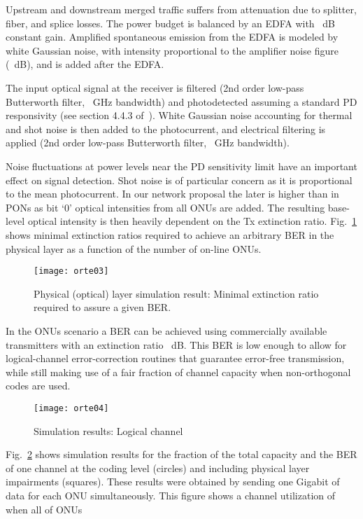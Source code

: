 \documentclass[10pt]{article}
\begin{document}
Upstream and downstream merged traffic suffers from attenuation due to
splitter, fiber, and
splice losses. The power budget is balanced by an EDFA with ~dB constant gain.
Amplified spontaneous emission from the EDFA is modeled by white Gaussian
noise, with intensity proportional to the amplifier noise figure (~dB), and is added
after the EDFA. 


The input optical signal at the receiver is filtered (2nd order low-pass Butterworth filter, ~GHz bandwidth) and photodetected assuming a standard PD responsivity (see section 4.4.3 of~\cite{Agrawal:xx}).
White Gaussian noise accounting for thermal and shot noise is then added
to the photocurrent, and 
electrical filtering is applied (2nd order low-pass Butterworth filter, ~GHz bandwidth).

Noise fluctuations at power levels near the PD sensitivity limit have an important effect on signal detection. 
Shot noise is of particular concern as it is proportional to the mean photocurrent.
In our network proposal the later is higher than in PONs as bit
`0' optical intensities from all ONUs are added.
The resulting base-level optical intensity is then heavily dependent on the Tx extinction ratio.
Fig.~\ref{sim:optical} shows minimal extinction ratios required to
achieve an arbitrary BER in the physical layer as a function of the
number of on-line ONUs.
\begin{figure}[!t]
    \centering
      \texttt{[image: orte03]}
      \caption{Physical (optical) layer simulation result: Minimal extinction ratio required to assure a given BER.}
      \label{sim:optical}
\end{figure}
In the  ONUs scenario a  BER can be achieved using
commercially available transmitters with an extinction ratio ~dB.
This BER is low enough to allow for logical-channel error-correction routines that guarantee error-free transmission, while still making use of a fair fraction of channel capacity when non-orthogonal codes are used.
\begin{figure}[!t]
    \centering
      \texttt{[image: orte04]}
    \caption{Simulation results: Logical channel}
      \label{sim:access}
\end{figure}
Fig.~\ref{sim:access} shows simulation results for the fraction of the total
capacity and the BER of one channel at the coding level (circles) and 
including physical layer impairments (squares). These results were obtained by
sending one Gigabit of data for each ONU simultaneously.
This figure shows a channel utilization of  when all of  ONUs
\end{document}
